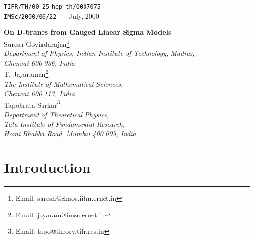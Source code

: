 \documentclass[a4paper,12pt]{article}
\begin{document}
\begin{titlepage}
\noindent
{\tt TIFR/TH/00-25} \hfill
{\tt hep-th/0007075}\\
{\tt IMSc/2000/06/22}~~~
\hfill July, 2000
\vfill
\begin{center}
{\Large \bf On D-branes from Gauged Linear Sigma Models} \\[1cm]
Suresh Govindarajan\footnote{Email: suresh@chaos.iitm.ernet.in}\\
{\em Department of Physics, Indian Institute of Technology, Madras,\\
Chennai 600 036, India\\[10pt]}
T. Jayaraman\footnote{Email: jayaram@imsc.ernet.in}\\
{\em The Institute of Mathematical Sciences, \\ Chennai 600 113, India\\
[10pt]}
Tapobrata Sarkar\footnote{Email: tapo@theory.tifr.res.in}\\
{\em Department of Theoretical Physics, \\ Tata Institute of 
Fundamental Research, \\ Homi Bhabha Road, Mumbai 400 005, India}\\ 
\end{center}
\vfill
\begin{abstract}
We study both A-type and B-type 
D-branes in the gauged  linear sigma model by considering
worldsheets with boundary. The boundary conditions on the matter and
vector multiplet fields are first considered in the 
large-volume phase/non-linear sigma model limit of the corresponding 
Calabi-Yau manifold, where we 
find that we need to add a contact term on the boundary. 
These considerations enable to us to derive the
boundary conditions in the full gauged linear sigma model, including the
addition of the appropriate boundary contact terms, such that these
boundary conditions have the correct non-linear sigma model limit. 
Most of the analysis is for the case of Calabi-Yau manifolds with
one K\"ahler modulus (including those corresponding to hypersurfaces
in weighted projectve space), though we comment on possible generalisations.
\end{abstract}
\vfill
\end{titlepage}


\section{Introduction}
\end{document}
